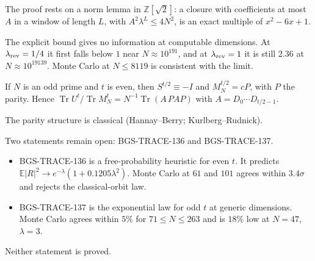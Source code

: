 The proof rests on a norm lemma in \(\mathbb Z[\sqrt2]\): a closure with
coefficients at most \(A\) in a window of length \(L\), with
\(A^2\lambda^L\le4N^2\), is an exact multiple of \(x^2-6x+1\).

The explicit bound gives no information at computable dimensions. At
\(\lambda_{\rm rev}=1/4\) it first falls below \(1\) near \(N\approx10^{191}\),
and at \(\lambda_{\rm rev}=1\) it is still \(2.36\) at \(N\approx10^{19139}\).
Monte Carlo at \(N\le8119\) is consistent with the limit.

\begin{theorem}
\label{thm:revival-parity}
If \(N\) is an odd prime and \(t\) is even, then \(S^{t/2}\equiv-I\) and
\(M_N^{t/2}=cP\), with \(P\) the parity. Hence
\(\operatorname{Tr}U^t/\operatorname{Tr}M_N^t=N^{-1}\operatorname{Tr}(A\,PAP)\)
with \(A=D_0\cdots D_{t/2-1}\).
\end{theorem}

The parity structure is classical (Hannay--Berry; Kurlberg--Rudnick).

Two statements remain open: BGS-TRACE-136 and BGS-TRACE-137.
\begin{itemize}
\item BGS-TRACE-136 is a free-probability heuristic for even \(t\). It
predicts \(\mathbb E\lvert R\rvert^2\to e^{-\lambda}(1+0.1205\lambda^2)\).
Monte Carlo at \(61\) and \(101\) agrees within \(3.4\sigma\) and rejects the
classical-orbit law.
\item BGS-TRACE-137 is the exponential law for odd \(t\) at generic
dimensions. Monte Carlo agrees within \(5\%\) for \(71\le N\le263\) and is
\(18\%\) low at \(N=47\), \(\lambda=3\).
\end{itemize}
Neither statement is proved.
